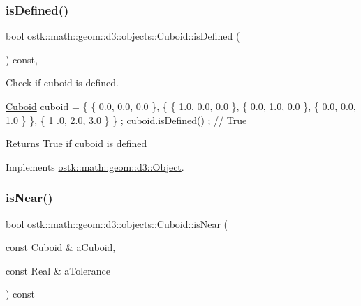 \subsubsection{\texorpdfstring{is\+Defined()}{isDefined()}}
{\footnotesize\ttfamily bool ostk\+::math\+::geom\+::d3\+::objects\+::\+Cuboid\+::is\+Defined (\begin{DoxyParamCaption}{ }\end{DoxyParamCaption}) const\hspace{0.3cm}{\ttfamily [override]}, {\ttfamily [virtual]}}



Check if cuboid is defined. 


\begin{DoxyCode}
\hyperlink{classostk_1_1math_1_1geom_1_1d3_1_1objects_1_1_cuboid_a1da071d7cbb0a694348628f098f77c5b}{Cuboid} cuboid = \{ \{ 0.0, 0.0, 0.0 \}, \{ \{ 1.0, 0.0, 0.0 \}, \{ 0.0, 1.0, 0.0 \}, \{ 0.0, 0.0, 1.0 \} \}, \{ 1
      .0, 2.0, 3.0 \} \} ;
cuboid.isDefined() ; \textcolor{comment}{// True}
\end{DoxyCode}


\begin{DoxyReturn}{Returns}
True if cuboid is defined 
\end{DoxyReturn}


Implements \hyperlink{classostk_1_1math_1_1geom_1_1d3_1_1_object_a271a1964cd208be85ce9a0a429395ad8}{ostk\+::math\+::geom\+::d3\+::\+Object}.

\mbox{\label{classostk_1_1math_1_1geom_1_1d3_1_1objects_1_1_cuboid_a4e4bcebf83464e2f946346d606c5f44c}} 
\subsubsection{\texorpdfstring{is\+Near()}{isNear()}}
{\footnotesize\ttfamily bool ostk\+::math\+::geom\+::d3\+::objects\+::\+Cuboid\+::is\+Near (\begin{DoxyParamCaption}\item[{const \hyperlink{classostk_1_1math_1_1geom_1_1d3_1_1objects_1_1_cuboid}{Cuboid} \&}]{a\+Cuboid,  }\item[{const Real \&}]{a\+Tolerance }\end{DoxyParamCaption}) const}



